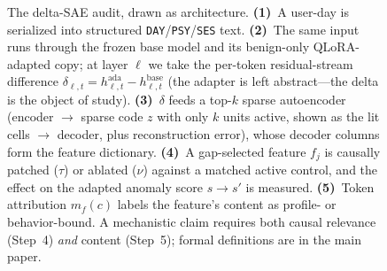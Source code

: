\begin{figure}[t]
{\begin{tikzpicture}
\end{tikzpicture}}%
\caption{The delta-SAE audit, drawn as architecture.
\textbf{(1)}~A user-day is serialized into structured
\texttt{DAY}/\texttt{PSY}/\texttt{SES} text.
\textbf{(2)}~The same input runs through the frozen base model and its
benign-only QLoRA-adapted copy; at layer $\ell$ we take the per-token
residual-stream difference
$\delta_{\ell,t}=h^{\mathrm{ada}}_{\ell,t}-h^{\mathrm{base}}_{\ell,t}$
(the adapter is left abstract---the delta is the object of study).
\textbf{(3)}~$\delta$ feeds a top-$k$ sparse autoencoder (encoder $\to$ sparse
code $z$ with only $k$ units active, shown as the lit cells $\to$ decoder,
plus reconstruction error), whose decoder columns form the feature dictionary.
\textbf{(4)}~A gap-selected feature $f_j$ is causally patched ($\tau$) or
ablated ($\nu$) against a matched active control, and the effect on the adapted
anomaly score $s\!\to\!s'$ is measured.
\textbf{(5)}~Token attribution $m_f(c)$ labels the feature's content as
profile- or behavior-bound. A mechanistic claim requires both causal relevance
(Step~4) \emph{and} content (Step~5); formal definitions are in the main paper.}
\label{fig:architecture}
\end{figure}
